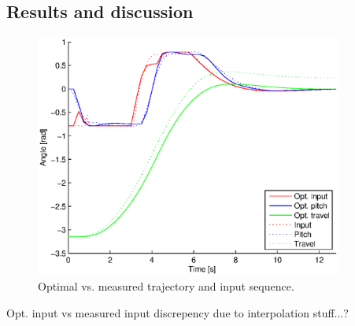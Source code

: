 \subsection{Results and discussion}

\begin{figure}[hp]
	\centering
		\includegraphics[width=0.9\textwidth]{figures/2/opt_vs_meas_traj.eps}
	\caption{Optimal vs. measured trajectory and input sequence.}
	\label{fig:opt_traj}
\end{figure}

Opt. input vs measured input discrepency due to interpolation stuff...?


